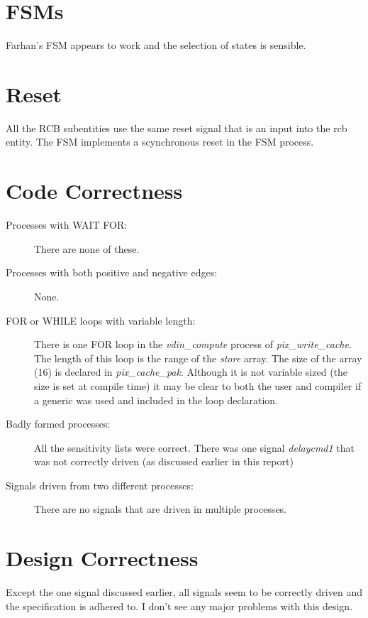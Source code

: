 \documentclass[11pt,a4paper]{article}
\begin{document}
\section{FSMs}
Farhan's FSM appears to work and the selection of states is sensible.

\section{Reset}
All the RCB subentities use the same reset signal that is an input into the rcb entity. The FSM implements a scynchronous reset in the FSM process.

\section{Code Correctness}
\begin{description}
\item[Processes with WAIT FOR:] There are none of these.

\item[Processes with both positive and negative edges:] None.

\item[FOR or WHILE loops with variable length:] There is one FOR loop in 
the \emph{vdin\_compute} process of \emph{pix\_write\_cache}. 
The length of this loop is the range of the \emph{store} array.
The size of the array (16) is declared in \emph{pix\_cache\_pak}.
Although it is not variable sized (the size is set at compile time) it may
be clear to both the user and compiler if a generic was used and included
in the loop declaration.
 
\item[Badly formed processes:] All the sensitivity lists were correct.
There was one signal \emph{delaycmd1} that was not correctly driven
(as discussed earlier in this report)

\item[Signals driven from two different processes:] There are no signals
that are driven in multiple processes.

\end{description}

\section{Design Correctness}
Except the one signal discussed earlier, all signals seem to be 
correctly driven and the specification is adhered to. I don't see any
major problems with this design.
\end{document}
